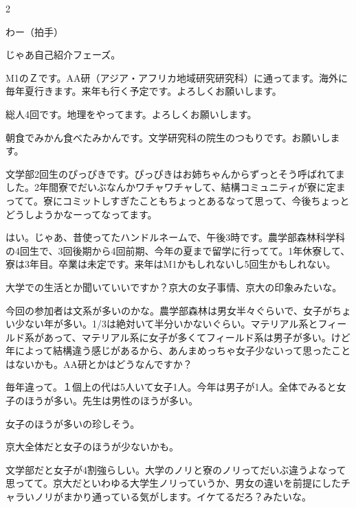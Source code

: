 \begin{multicols}{2}


 わー（拍手）

 じゃあ自己紹介フェーズ。

 M1のＺです。AA研（アジア・アフリカ地域研究研究科）に通ってます。海外に毎年夏行きます。来年も行く予定です。よろしくお願いします。

 総人4回です。地理をやってます。よろしくお願いします。

 朝食でみかん食べたみかんです。文学研究科の院生のつもりです。お願いします。

 文学部2回生のぴっぴきです。ぴっぴきはお姉ちゃんからずっとそう呼ばれてました。2年間寮でだいぶなんかワチャワチャして、結構コミュニティが寮に定まってて。寮にコミットしすぎたこともちょっとあるなって思って、今後ちょっとどうしようかなーってなってます。

 はい。じゃあ、昔使ってたハンドルネームで、午後3時です。農学部森林科学科の4回生で、3回後期から4回前期、今年の夏まで留学に行ってて。1年休寮して、寮は3年目。卒業は未定です。来年はM1かもしれないし5回生かもしれない。


 大学での生活とか聞いていいですか？京大の女子事情、京大の印象みたいな。

 今回の参加者は文系が多いのかな。農学部森林は男女半々ぐらいで、女子がちょい少ない年が多い。1/3は絶対いて半分いかないぐらい。マテリアル系とフィールド系があって、マテリアル系に女子が多くてフィールド系は男子が多い。けど年によって結構違う感じがあるから、あんまめっちゃ女子少ないって思ったことはないかも。AA研とかはどうなんですか？

 毎年違って。１個上の代は5人いて女子1人。今年は男子が1人。全体でみると女子のほうが多い。先生は男性のほうが多い。

 女子のほうが多いの珍しそう。

 京大全体だと女子のほうが少ないかも。

 文学部だと女子が4割強らしい。大学のノリと寮のノリってだいぶ違うよなって思ってて。京大だといわゆる大学生ノリっていうか、男女の違いを前提にしたチャラいノリがまかり通っている気がします。イケてるだろ？みたいな。


\end{multicols}
